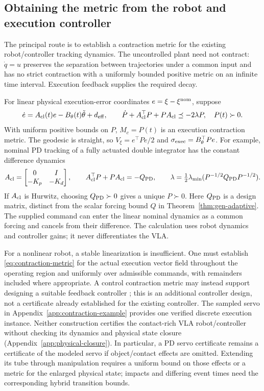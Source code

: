 \subsection{Obtaining the metric from the robot and execution controller}
\label{app:gen-innerloop}
The principal route is to establish a contraction metric for the existing
robot/controller tracking dynamics. The uncontrolled plant need not
contract: $\dot q=u$ preserves the separation between trajectories under
a common input and has no strict contraction with a uniformly bounded
positive metric on an infinite time interval. Execution feedback supplies
the required decay.

For linear physical execution-error coordinates $e=\xi-\xi^{\rm nom}$, suppose
\begin{equation}
 \dot e=A_{\rm cl}(t)e-B_\theta(t)\tilde\theta+d_{\rm eff},\qquad
 \dot P+A_{\rm cl}^\top P+PA_{\rm cl}\preceq-2\lambda P,\quad P(t)\succ0.
 \label{eq:gen-linear-example}
\end{equation}
With uniform positive bounds on $P$, $M_c=P(t)$ is an execution
contraction metric. The geodesic is straight, so
$V_\xi=e^\top Pe/2$ and $\sigma_{\rm exec}=B_\theta^\top Pe$.
For example, nominal PD tracking of a fully actuated double integrator
has the constant difference dynamics
\begin{equation}
 A_{\rm cl}=\begin{bmatrix}0&I\\-K_p&-K_d\end{bmatrix},\qquad
 A_{\rm cl}^\top P+PA_{\rm cl}=-Q_{\rm PD},\qquad
 \lambda=\tfrac12\lambda_{\min}
       (P^{-1/2}Q_{\rm PD}P^{-1/2}).
 \label{eq:exec-pd-metric}
\end{equation}
If $A_{\rm cl}$ is Hurwitz, choosing $Q_{\rm PD}\succ0$ gives a unique
$P\succ0$. Here $Q_{\rm PD}$ is a design matrix, distinct from the scalar
forcing bound $Q$ in Theorem~\ref{thm:gen-adaptive}. The supplied command
can enter the linear nominal dynamics as a common forcing and cancels
from their difference. The calculation uses robot dynamics and controller
gains; it never differentiates the VLA.

For a nonlinear robot, a stable linearization is insufficient. One must
establish \eqref{eq:contraction-metric} for the actual execution vector
field throughout the operating region and uniformly over admissible
commands, with remainders included where appropriate. A control
contraction metric may instead support designing a suitable feedback
controller \citep{manchester2017}; this is an additional controller design,
not a certificate already established for the existing controller. The
sampled servo in Appendix~\ref{app:contraction-example} provides one
verified discrete execution instance. Neither construction certifies the
contact-rich VLA robot/controller without checking its dynamics and
physical state closure (Appendix~\ref{app:physical-closure}). In particular,
a PD servo certificate remains a certificate of the modeled servo if
object/contact effects are omitted. Extending its tube through manipulation
requires a uniform bound on those effects or a metric for the enlarged
physical state; impacts and differing event times need the corresponding
hybrid transition bounds.

